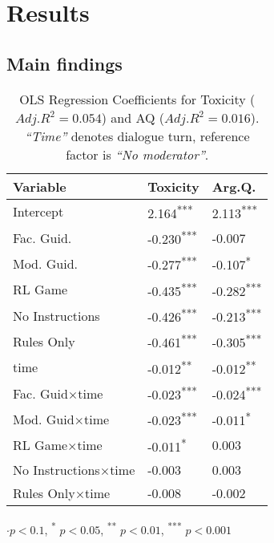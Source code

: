 %

\section{Results}
\label{sec:results}

\subsection{Main findings}

\begin{table}[t]
    \centering
    \begin{tabular}{lll}
        \toprule
        \textbf{Variable} & \textbf{Toxicity} & \textbf{Arg.Q.} \\
        \midrule
        Intercept & 2.164\textsuperscript{***} & 2.113\textsuperscript{***} \\
        Fac. Guid. & -0.230\textsuperscript{***} & -0.007 \\
        Mod. Guid. & -0.277\textsuperscript{***} & -0.107\textsuperscript{*} \\
        \ac{RL} Game & -0.435\textsuperscript{***} & -0.282\textsuperscript{***} \\
        No Instructions & -0.426\textsuperscript{***} & -0.213\textsuperscript{***} \\
        Rules Only & -0.461\textsuperscript{***} & -0.305\textsuperscript{***} \\
        time & -0.012\textsuperscript{**} & -0.012\textsuperscript{**} \\
        Fac. Guid$\times$time & -0.023\textsuperscript{***} & -0.024\textsuperscript{***} \\
        Mod. Guid$\times$time & -0.023\textsuperscript{***} & -0.011\textsuperscript{*} \\
        \ac{RL} Game$\times$time & -0.011\textsuperscript{*} & 0.003 \\
        No Instructions$\times$time & -0.003 & 0.003 \\
        Rules Only$\times$time & -0.008 & -0.002 \\
        \bottomrule
    \end{tabular}
    \small
    $\cdot p<0.1$, \textsuperscript{*} $p<0.05$, \textsuperscript{**} $p<0.01$, \textsuperscript{***} $p<0.001$
    \normalsize
    \caption{OLS Regression Coefficients for Toxicity ($Adj. R^2=0.054$) and \ac{AQ} ($Adj. R^2=0.016$). \textit{“Time”} denotes dialogue turn, reference factor is \textit{“No moderator”}.}
    \label{tab:timeseries}
\end{table}

